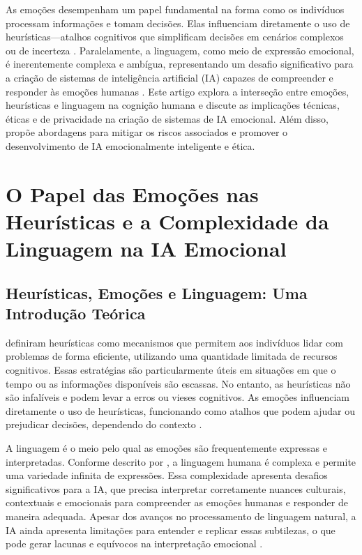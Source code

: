 \documentclass[a4paper,12pt]{report}
\begin{document}
	As emoções desempenham um papel fundamental na forma como os indivíduos processam informações e tomam decisões. Elas influenciam diretamente o uso de heurísticas—atalhos cognitivos que simplificam decisões em cenários complexos ou de incerteza \parencite{kahneman1974}. Paralelamente, a linguagem, como meio de expressão emocional, é inerentemente complexa e ambígua, representando um desafio significativo para a criação de sistemas de inteligência artificial (IA) capazes de compreender e responder às emoções humanas \parencite{chomsky1965}. Este artigo explora a interseção entre emoções, heurísticas e linguagem na cognição humana e discute as implicações técnicas, éticas e de privacidade na criação de sistemas de IA emocional. Além disso, propõe abordagens para mitigar os riscos associados e promover o desenvolvimento de IA emocionalmente inteligente e ética.
	
	\section{O Papel das Emoções nas Heurísticas e a Complexidade da Linguagem na IA Emocional}
	
	\subsection{Heurísticas, Emoções e Linguagem: Uma Introdução Teórica}
	
	\textcite{kahneman1974} definiram heurísticas como mecanismos que permitem aos indivíduos lidar com problemas de forma eficiente, utilizando uma quantidade limitada de recursos cognitivos. Essas estratégias são particularmente úteis em situações em que o tempo ou as informações disponíveis são escassas. No entanto, as heurísticas não são infalíveis e podem levar a erros ou vieses cognitivos. As emoções influenciam diretamente o uso de heurísticas, funcionando como atalhos que podem ajudar ou prejudicar decisões, dependendo do contexto \parencite{slovic2007}.
	
	A linguagem é o meio pelo qual as emoções são frequentemente expressas e interpretadas. Conforme descrito por \textcite{chomsky1965}, a linguagem humana é complexa e permite uma variedade infinita de expressões. Essa complexidade apresenta desafios significativos para a IA, que precisa interpretar corretamente nuances culturais, contextuais e emocionais para compreender as emoções humanas e responder de maneira adequada. Apesar dos avanços no processamento de linguagem natural, a IA ainda apresenta limitações para entender e replicar essas subtilezas, o que pode gerar lacunas e equívocos na interpretação emocional \parencite{russell2020}.
	
\end{document}
